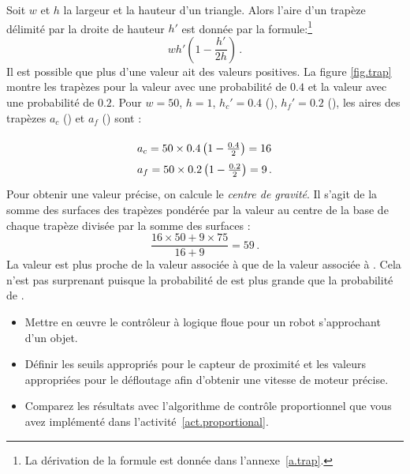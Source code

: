 Soit $w$ et $h$ la largeur et la hauteur d'un triangle. Alors l'aire d'un trapèze délimité par la droite de hauteur $h'$ est donnée par la formule:\footnote{La dérivation de la formule est donnée dans l'annexe~\ref{a.trap}.}
\begin{displaymath}
wh'\left(1-\frac{h'}{2h}\right)\,.
\end{displaymath}
Il est possible que plus d'une valeur ait des valeurs positives. La figure \ref{fig.trap} montre les trapèzes pour la valeur  avec une probabilité de $0.4$ et la valeur  avec une probabilité de $0.2$. Pour $w=50$, $h=1$, $h_{c}'=0.4$ (), $h_{f}'=0.2$ (), les aires des trapèzes $a_c$ () et $a_f$ () sont :

\begin{displaymath}
\spacearray
\begin{array}{l}
a_c = 50\times 0.4 \left(1 - \frac{0.4}{2}\right) = 16\\
a_f = 50\times 0.2 \left(1 - \frac{0.2}{2}\right) = 9\,.
\end{array}
\end{displaymath}
Pour obtenir une valeur précise, on calcule le \emph{centre de gravité}. Il s'agit de la somme des surfaces des trapèzes pondérée par la valeur au centre de la base de chaque trapèze divisée par la somme des surfaces :
\begin{displaymath}
\frac{16\times 50 + 9\times 75}{16+9}=59\,.
\end{displaymath}
La valeur est plus proche de la valeur associée à  que de la valeur associée à . Cela n'est pas surprenant puisque la probabilité de  est plus grande que la probabilité de .

\begin{framed}
\begin{itemize}
\item Mettre en œuvre le contrôleur à logique floue pour un robot s'approchant d'un objet.
\item Définir les seuils appropriés pour le capteur de proximité et les valeurs appropriées pour le défloutage afin d'obtenir une vitesse de moteur précise.
\item Comparez les résultats avec l'algorithme de contrôle proportionnel que vous avez implémenté dans l'activité~\ref{act.proportional}.
\end{itemize}
\end{framed}

